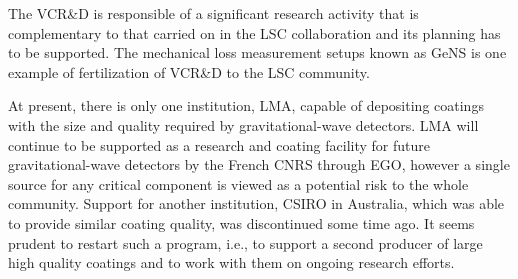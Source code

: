 The VCR\&D is responsible of a significant research activity that is complementary to that carried on in the LSC collaboration and its planning has to be supported.  The mechanical loss measurement setups known as GeNS is one example of fertilization of VCR\&D to the LSC community. 

At present, there is only one institution, LMA, capable of depositing coatings with the size and quality required by gravitational-wave detectors. LMA will continue to be supported as a research and coating facility for future gravitational-wave detectors by the French CNRS through EGO, however a single source for any critical component is viewed as a potential risk to the whole community. Support for another institution, CSIRO in Australia, which was able to provide similar coating quality, was discontinued some time ago. It seems prudent to restart such a program, i.e., to support a second producer of large high quality coatings and to work with them on ongoing research efforts. 




